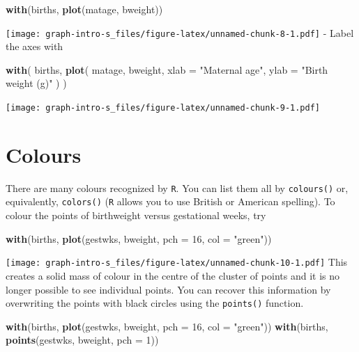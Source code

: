 \documentclass[
]{book}
\newenvironment{Shaded}{\begin{snugshade}}{\end{snugshade}}
\newcommand{\AttributeTok}[1]{\textcolor[rgb]{0.13,0.29,0.53}{#1}}
\newcommand{\DecValTok}[1]{\textcolor[rgb]{0.00,0.00,0.81}{#1}}
\newcommand{\FunctionTok}[1]{\textcolor[rgb]{0.13,0.29,0.53}{\textbf{#1}}}
\newcommand{\NormalTok}[1]{#1}
\newcommand{\StringTok}[1]{\textcolor[rgb]{0.31,0.60,0.02}{#1}}
\begin{document}
\begin{Shaded}
\begin{Highlighting}[]
\FunctionTok{with}\NormalTok{(births, }\FunctionTok{plot}\NormalTok{(matage, bweight))}
\end{Highlighting}
\end{Shaded}

\texttt{[image: graph-intro-s\_files/figure-latex/unnamed-chunk-8-1.pdf]}
- Label the axes with

\begin{Shaded}
\begin{Highlighting}[]
\FunctionTok{with}\NormalTok{(}
\NormalTok{  births, }
  \FunctionTok{plot}\NormalTok{(}
\NormalTok{    matage, }
\NormalTok{    bweight, }
    \AttributeTok{xlab =} \StringTok{"Maternal age"}\NormalTok{, }
    \AttributeTok{ylab =} \StringTok{"Birth weight (g)"}
\NormalTok{  )}
\NormalTok{)}
\end{Highlighting}
\end{Shaded}

\texttt{[image: graph-intro-s\_files/figure-latex/unnamed-chunk-9-1.pdf]}

\section{Colours}\label{colours}

There are many colours recognized by \texttt{R}. You can list them all by
\texttt{colours()} or, equivalently, \texttt{colors()} (\texttt{R} allows you to
use British or American spelling). To colour the points of birthweight
versus gestational weeks, try

\begin{Shaded}
\begin{Highlighting}[]
\FunctionTok{with}\NormalTok{(births, }\FunctionTok{plot}\NormalTok{(gestwks, bweight, }\AttributeTok{pch =} \DecValTok{16}\NormalTok{, }\AttributeTok{col =} \StringTok{"green"}\NormalTok{))}
\end{Highlighting}
\end{Shaded}

\texttt{[image: graph-intro-s\_files/figure-latex/unnamed-chunk-10-1.pdf]}
This creates a solid mass of colour in the centre of the cluster of
points and it is no longer possible to see individual points. You can
recover this information by overwriting the points with black circles
using the \texttt{points()} function.

\begin{Shaded}
\begin{Highlighting}[]
\FunctionTok{with}\NormalTok{(births, }\FunctionTok{plot}\NormalTok{(gestwks, bweight, }\AttributeTok{pch =} \DecValTok{16}\NormalTok{, }\AttributeTok{col =} \StringTok{"green"}\NormalTok{))}
\FunctionTok{with}\NormalTok{(births, }\FunctionTok{points}\NormalTok{(gestwks, bweight, }\AttributeTok{pch =} \DecValTok{1}\NormalTok{))}
\end{Highlighting}
\end{Shaded}
\end{document}
